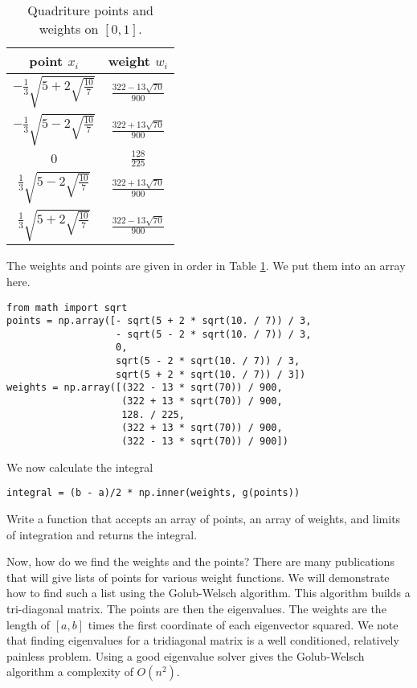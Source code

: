 \begin{table}[h!]
\begin{center}
\begin{tabular}{|c|c|}
\hline
point $x_i$ & weight $w_i$ \\
\hline
$-\frac{1}{3}\sqrt{5 + 2\sqrt{\frac{10}{7}}}$ &  $\frac{322-13\sqrt{70}}{900}$ \\
\hline
$-\frac{1}{3}\sqrt{5 - 2\sqrt{\frac{10}{7}}}$ & $\frac{322+13\sqrt{70}}{900}$ \\
\hline
$0$ & $\frac{128}{225}$ \\
\hline
$\frac{1}{3}\sqrt{5 - 2\sqrt{\frac{10}{7}}}$ & $\frac{322+13\sqrt{70}}{900}$ \\
\hline
$\frac{1}{3}\sqrt{5 + 2\sqrt{\frac{10}{7}}}$ & $\frac{322-13\sqrt{70}}{900}$ \\
\hline
\end{tabular}
\end{center}
\caption{Quadriture points and weights on $\left[0, 1\right]$.}
\label{intro_table}
\end{table}

The weights and points are given in order in Table \ref{intro_table}.
We put them into an array here.

\begin{lstlisting}
from math import sqrt
points = np.array([- sqrt(5 + 2 * sqrt(10. / 7)) / 3,
                   - sqrt(5 - 2 * sqrt(10. / 7)) / 3,
                   0,
                   sqrt(5 - 2 * sqrt(10. / 7)) / 3,
                   sqrt(5 + 2 * sqrt(10. / 7)) / 3])
weights = np.array([(322 - 13 * sqrt(70)) / 900,
                    (322 + 13 * sqrt(70)) / 900,
                    128. / 225,
                    (322 + 13 * sqrt(70)) / 900,
                    (322 - 13 * sqrt(70)) / 900])
\end{lstlisting}

We now calculate the integral

\begin{lstlisting}
integral = (b - a)/2 * np.inner(weights, g(points))
\end{lstlisting}

\begin{problem}

Write a function that accepts an array of points, an array of weights, and limits of integration and returns the integral.

\end{problem}

Now, how do we find the weights and the points?
There are many publications that will give lists of points for various weight functions.
We will demonstrate how to find such a list using the Golub-Welsch algorithm.
This algorithm builds a tri-diagonal matrix.
The points are then the eigenvalues.
The weights are the length of $\left[a, b\right]$ times the first coordinate of each eigenvector squared.
We note that finding eigenvalues for a tridiagonal matrix is a well conditioned, relatively painless problem.
Using a good eigenvalue solver gives the Golub-Welsch algorithm a complexity of $O(n^2)$.

